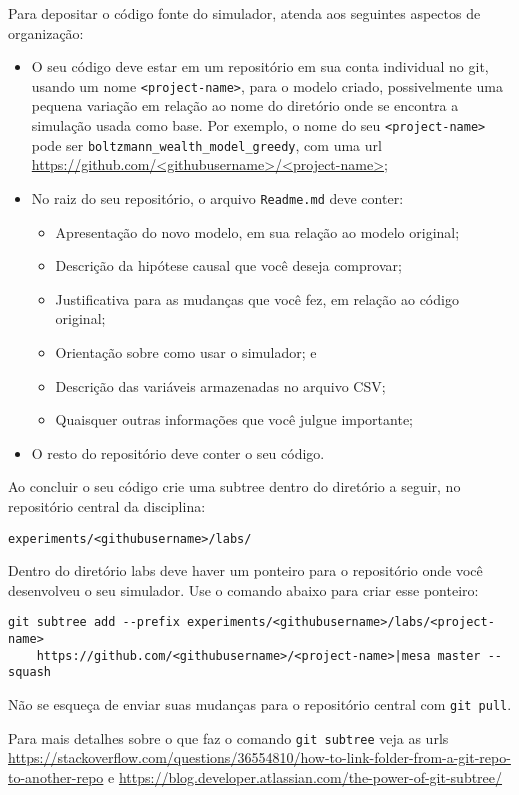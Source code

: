 Para depositar o código fonte do simulador, atenda aos seguintes aspectos de organização:
\begin{itemize}
    \item O seu código deve estar em um repositório em sua conta individual no git, usando um nome \verb|<project-name>|, para o modelo criado, possivelmente uma pequena variação em relação ao nome do diretório onde se encontra a simulação usada como base. Por exemplo, o nome do seu \verb|<project-name>| pode ser
    \verb|boltzmann_wealth_model_greedy|, com uma url \url{https://github.com/<githubusername>/<project-name>};
    \item No raiz do seu repositório, o arquivo \verb|Readme.md| deve conter:
    \begin{itemize}
        \item Apresentação do novo modelo, em sua relação ao modelo original;
        \item Descrição da hipótese causal que você deseja comprovar;
        \item Justificativa para as mudanças que você fez, em relação ao código original;
        \item Orientação sobre como usar o simulador; e
        \item Descrição das variáveis armazenadas no arquivo CSV;
        \item Quaisquer outras informações que você julgue importante;
    \end{itemize}
    \item O resto do repositório deve conter o seu código.
\end{itemize}

Ao concluir o seu código crie uma subtree dentro do diretório a seguir, no repositório central da disciplina:

\verb|experiments/<githubusername>/labs/|

Dentro do diretório labs deve haver um ponteiro para o repositório onde você desenvolveu o seu simulador. Use o comando abaixo para criar esse ponteiro:

{\footnotesize
\begin{verbatim}
git subtree add --prefix experiments/<githubusername>/labs/<project-name> 
    https://github.com/<githubusername>/<project-name>|mesa master --squash
\end{verbatim}
}

Não se esqueça de enviar suas mudanças para o repositório central com \verb|git pull|.

Para mais detalhes sobre o que faz o comando \verb|git subtree| veja as urls \url{https://stackoverflow.com/questions/36554810/how-to-link-folder-from-a-git-repo-to-another-repo} e \url{https://blog.developer.atlassian.com/the-power-of-git-subtree/}

